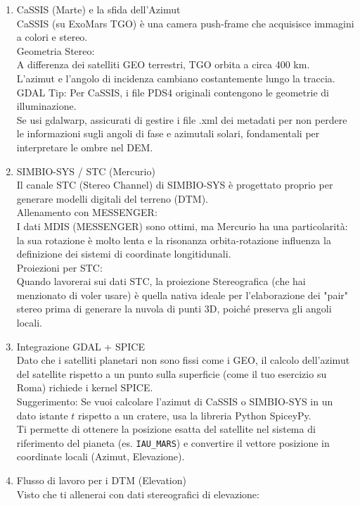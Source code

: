 \documentclass[a4paper,14pt]{article}
\begin{document}
\begin{enumerate}
\item CaSSIS (Marte) e la sfida dell'Azimut\\
CaSSIS (su ExoMars TGO) è una camera push-frame che acquisisce immagini a colori e stereo.\\
Geometria Stereo:\\
A differenza dei satelliti GEO terrestri, TGO orbita a circa 400 km.\\
L'azimut e l'angolo di incidenza cambiano costantemente lungo la traccia.\\
GDAL Tip: Per CaSSIS, i file PDS4 originali contengono le geometrie di illuminazione.\\
Se usi gdalwarp, assicurati di gestire i file .xml dei metadati per non perdere le informazioni sugli angoli di fase e azimutali solari, fondamentali per interpretare le ombre nel DEM.\\
\item SIMBIO-SYS / STC (Mercurio)\\
Il canale STC (Stereo Channel) di SIMBIO-SYS è progettato proprio per generare modelli digitali del terreno (DTM).\\
Allenamento con MESSENGER:\\
I dati MDIS (MESSENGER) sono ottimi, ma Mercurio ha una particolarità: la sua rotazione è molto lenta e la risonanza orbita-rotazione influenza la definizione dei sistemi di coordinate longitidunali.\\
Proiezioni per STC:\\
Quando lavorerai sui dati STC, la proiezione Stereografica (che hai menzionato di voler usare) è quella nativa ideale per l'elaborazione dei "pair" stereo prima di generare la nuvola di punti 3D, poiché preserva gli angoli locali.\\
\item Integrazione GDAL + SPICE\\
Dato che i satelliti planetari non sono fissi come i GEO, il calcolo dell'azimut del satellite rispetto a un punto sulla superficie (come il tuo esercizio su Roma) richiede i kernel SPICE.\\
Suggerimento: Se vuoi calcolare l'azimut di CaSSIS o SIMBIO-SYS in un dato istante \(t\) rispetto a un cratere, usa la libreria Python SpiceyPy.\\
Ti permette di ottenere la posizione esatta del satellite nel sistema di riferimento del pianeta (es. \verb|IAU_MARS|) e convertire il vettore posizione in coordinate locali (Azimut, Elevazione).\\
\item Flusso di lavoro per i DTM (Elevation)\\
Visto che ti allenerai con dati stereografici di elevazione:\\
\end{enumerate}
\end{document}
